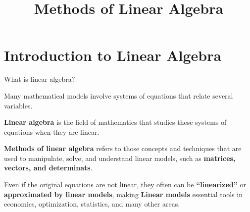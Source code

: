 \documentclass[9pt]{beamer}
\title{\Huge Methods of Linear Algebra}
\begin{document}
\maketitle


\section{Introduction to Linear Algebra}

\begin{frame}{What is linear algebra?}

    Many mathematical models involve systems of equations that relate several variables.

    \textbf{Linear algebra} is the field of mathematics that studies these systems of equations when they are linear.
    \vspace{0.3cm}

    \textbf{Methods of linear algebra} refers to those concepts and techniques that are used to manipulate, solve, and understand linear models, such as \textbf{matrices, vectors, and determinats}.
    \vspace{0.3cm}
    
    Even if the original equations are not linear, they often can be \textbf{``linearized''} or \textbf{approximated by linear models}, making \textbf{Linear models} essential tools in economics, optimization, statistics, and many other areas.
    
\end{frame}
\end{document}
